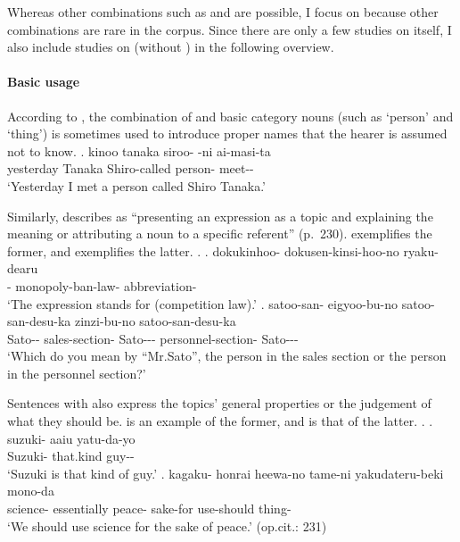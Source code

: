 Whereas other combinations such as  and  are possible,
I focus on  because other combinations are rare in the corpus.
Since there are only a few studies on  itself,
I also include studies on  (without ) in the following overview.

\paragraph{Basic usage}

According to ,
the combination of
 and basic category nouns (such as  `person' and  `thing') is sometimes used to introduce proper names that the hearer is assumed not to know.
%
\exg. kinoo tanaka siroo- -ni ai-masi-ta \\
	yesterday Tanaka Shiro-called person- meet-- \\
	`Yesterday I met a person called Shiro Tanaka.'
	\hfill{\cite[][p.\ 218]{takubo89}}


Similarly,  describes  as
``presenting an expression as a topic and explaining the meaning or
attributing a noun to a specific referent'' (p.~230).
\Next[a] exemplifies the former, and
\Next[b] exemplifies the latter.
%
\ex.
 \ag. dokukinhoo- dokusen-kinsi-hoo-no ryaku-dearu \\
      - monopoly-ban-law- abbreviation- \\
      `The expression  stands for  (competition law).'
 \bg. satoo-san- eigyoo-bu-no satoo-san-desu-ka zinzi-bu-no satoo-san-desu-ka\\
      Sato-- sales-section- Sato--- personnel-section- Sato---\\
      `Which do you mean by ``Mr.Sato'', the person in the sales section or the person in the personnel section?'
      \hfill{\cite[230]{kijutubumpokenkyukai09}}


Sentences with  also express
the topics' general properties or the judgement of what they should be.
\Next[a] is an example of the former, and
\Next[b] is that of the latter.
%
\ex.
 \ag. suzuki- aaiu yatu-da-yo \\
      Suzuki- that.kind guy-- \\
      `Suzuki is that kind of guy.'
 \bg. kagaku- honrai heewa-no tame-ni yakudateru-beki mono-da \\
      science- essentially peace- sake-for use-should thing- \\
      `We should use science for the sake of peace.'
      \hfill{(op.cit.: 231)}


